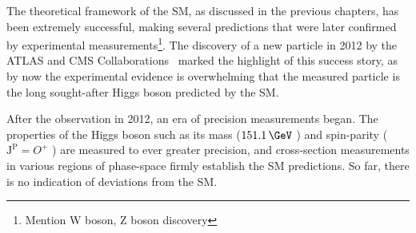 


The theoretical framework of the SM, as discussed in the previous chapters, has been extremely successful, making several predictions that were later confirmed by experimental measurements\footnote{Mention W boson, Z boson discovery}. 
The discovery of a new particle in 2012 by the ATLAS and CMS Collaborations~\cite{Aad:2012tfa,Chatrchyan:2012xdj} marked the highlight of this success story, as by now the experimental evidence is overwhelming that the measured particle is the long sought-after Higgs boson predicted by the SM.

After the observation in 2012, an era of precision measurements began. 
The properties of the Higgs boson such as its mass ($151.1\,\GeV$ ) and spin-parity ($\text{J}^\text{P} = O^+$ ) are measured to ever greater precision, and cross-section measurements in various regions of phase-space firmly establish the SM predictions. 
So far, there is no indication of deviations from the SM. 

